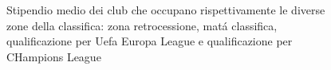 \documentclass[
    corpo=11.5pt,
    oneside,
    evenboxes,
    tipotesi=triennale,
    stile=classica,
    oldstyle,
    autoretitolo,
    greek,
]{toptesi}
\begin{document}
\begin{interlinea}{1.5}
\begin{figure}
    \caption{Stipendio medio dei club che occupano rispettivamente le diverse zone della classifica: zona retrocessione, 
    mat\'a classifica, qualificazione per Uefa Europa League e qualificazione per CHampions League}
    \label{stipendi_ligue1}
\end{figure}
\end{interlinea}
\end{document}
